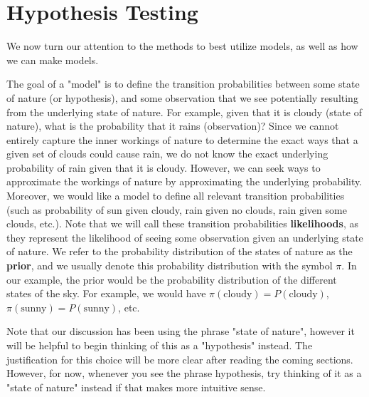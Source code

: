 \section{Hypothesis Testing}

We now turn our attention to the methods to best utilize models, as well as how we can make models. \newline 

The goal of a "model" is to define the transition probabilities between some state of nature (or hypothesis), and some observation that we see potentially resulting from the underlying state of nature. For example, given that it is cloudy (state of nature), what is the probability that it rains (observation)? Since we cannot entirely capture the inner workings of nature to determine the exact ways that a given set of clouds could cause rain, we do not know the exact underlying probability of rain given that it is cloudy. However, we can seek ways to approximate the workings of nature by approximating the underlying probability. Moreover, we would like a model to define all relevant transition probabilities (such as probability of sun given cloudy, rain given no clouds, rain given some clouds, etc.). Note that we will call these transition probabilities \textbf{likelihoods}, as they represent the likelihood of seeing some observation given an underlying state of nature. We refer to the probability distribution of the states of nature as the \textbf{prior}, and we usually denote this probability distribution with the symbol \(\pi\). In our example, the prior would be the probability distribution of the different states of the sky. For example, we would have \(\pi(\textrm{cloudy}) = P(\textrm{cloudy})\), \(\pi(\textrm{sunny}) = P(\textrm{sunny})\), etc. \newline 

Note that our discussion has been using the phrase "state of nature", however it will be helpful to begin thinking of this as a "hypothesis" instead. The justification for this choice will be more clear after reading the coming sections. However, for now, whenever you see the phrase hypothesis, try thinking of it as a "state of nature" instead if that makes more intuitive sense.

